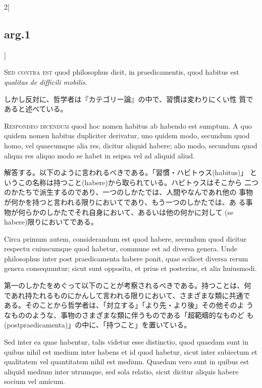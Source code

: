 \documentclass[paper=a4paper,fontsize=10pt,jafontsize=9pt,titlepage]{jlreq}
\begin{document}
\begin{paracol}{2}[\subsection{arg.1}]
\switchcolumn*[\subsection{s.c.}]

{\scshape Sed contra est} quod philosophus dicit, in praedicamentis, quod habitus
est {\itshape qualitas de difficili mobilis}.

\switchcolumn

しかし反対に、哲学者は『カテゴリー論』の中で、習慣は変わりにくい性
質であると述べている。


{\scshape Respondeo dicendum} quod hoc nomen habitus ab habendo est sumptum. A
quo quidem nomen habitus dupliciter derivatur, uno quidem modo,
secundum quod homo, vel quaecumque alia res, dicitur aliquid habere;
alio modo, secundum quod aliqua res aliquo modo se habet in seipsa vel
ad aliquid aliud.

\switchcolumn

解答する。以下のように言われるべきである。「習慣・ハビトゥス(habitus)」
というこの名称は持つこと(habere)から取られている。ハビトゥスはそこから
二つのかたちで派生するのであり、一つのしかたでは、人間やなんであれ他の
事物が何かを持つと言われる限りにおいてであり、もう一つのしかたでは、あ
る事物が何らかのしかたでそれ自身において、あるいは他の何かに対して
(se habere)限りにおいてである。

\switchcolumn*

Circa primum autem, considerandum est quod habere,
secundum quod dicitur respectu cuiuscumque quod habetur, commune est
ad diversa genera. Unde philosophus inter post praedicamenta habere
ponit, quae scilicet diversa rerum genera consequuntur; sicut sunt
opposita, et prius et posterius, et alia huiusmodi.

\switchcolumn

第一のしかたをめぐって以下のことが考察されるべきである。持つことは、何
であれ持たれるものにかんして言われる限りにおいて、さまざまな類に共通で
ある。そのことから哲学者は、「対立する」「より先・より後」その他そのよ
うなもののような、事物のさまざまな類に伴うものである「超範疇的なものど
も(postpraedicamenta)」の中に、「持つこと」を置いている。

\switchcolumn*

Sed inter ea quae
habentur, talis videtur esse distinctio, quod quaedam sunt in quibus
nihil est medium inter habens et id quod habetur, sicut inter
subiectum et qualitatem vel quantitatem nihil est medium. Quaedam vero
sunt in quibus est aliquid medium inter utrumque, sed sola relatio,
sicut dicitur aliquis habere socium vel amicum.


\end{paracol}
\end{document}
